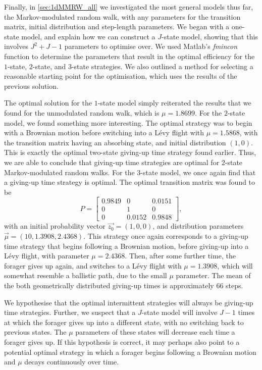 Finally, in \cref{sec:1dMMRW_all} we investigated the most general models thus far, the Markov-modulated random walk, with any parameters for the transition matrix, initial distribution and step-length parameters. We began with a one-state model, and explain how we can construct a $J$-state model, showing that this involves $J^2+J-1$ parameters to optimise over. We used Matlab's \emph{fmincon} function to determine the parameters that result in the optimal efficiency for the $1$-state, $2$-state, and $3$-state strategies. We also outlined a method for selecting a reasonable starting point for the optimisation, which uses the results of the previous solution.

The optimal solution for the $1$-state model simply reiterated the results that we found for the unmodulated random walk, which is $\mu = 1.8699$. For the $2$-state model, we found something more interesting. The optimal strategy was to begin with a Brownian motion before switching into a L\'{e}vy flight with $\mu=1.5868$, with the transition matrix having an absorbing state, and initial distribution $(1,0)$. This is exactly the optimal two-state giving-up time strategy found earlier. Thus, we are able to conclude that giving-up time strategies are optimal for $2$-state Markov-modulated random walks. For the $3$-state model, we once again find that a giving-up time strategy is optimal. The optimal transition matrix was found to be
\begin{equation*}
P = \begin{bmatrix}
0.9849  &  0 &   0.0151\\
0  &  1  &  0\\
0 &  0.0152   & 0.9848
\end{bmatrix},
\end{equation*}
with an initial probability vector $\vec{z_{0}} = (1,0,0)$, and distribution parameters $\vec{\mu} = (10, 1.3908,    2.4368)$. This strategy once again corresponds to a giving-up time strategy that begins following a Brownian motion, before giving-up into a L\'{e}vy flight, with parameter $\mu = 2.4368$. Then, after some further time, the forager gives up again, and switches to a L\'{e}vy flight with $\mu = 1.3908$, which will somewhat resemble a ballistic path, due to the small $\mu$ parameter. The mean of the both geometrically distributed giving-up times is approximately $66$ steps. 

We hypothesise that the optimal intermittent strategies will always be giving-up time strategies. Further, we suspect that a $J$-state model will involve $J-1$ times at which the forager gives up into a different state, with no switching back to previous states. The $\mu$ parameters of these states will decrease each time a forager gives up. If this hypothesis is correct, it may perhaps also point to a potential optimal strategy in which a forager begins following a Brownian motion and $\mu$ decays continuously over time.

